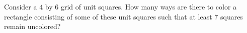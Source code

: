 Consider a $4$ by $6$ grid of unit squares. How many ways are there to color a rectangle consisting of some of these unit squares such that at least $7$ squares remain uncolored?
